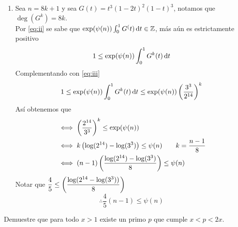 \begin{sol}
\begin{enumerate}[label = \roman*]
		\item Sea $n=8k+1$ y sea $G(t)=t^3(1-2t)^2(1-t)^3$, notamos que $\deg(G^k)=8k$.\\
		      Por \eqref{eq:ii} se sabe que $\exp(\psi(n))\int_0^1G^(t)\operatorname{d}\!{t}\in\mathbb{Z}$, más aún es estrictamente positivo
		      \begin{equation*}
			      1\leq\exp(\psi(n))\int_0^1G^k(t)\operatorname{d}\!{t}
		      \end{equation*}
		      Complementando con \eqref{eq:iii}
		      \begin{equation*}
			      1\leq\exp(\psi(n))\int_0^1G^k(t)\operatorname{d}\!{t}\leq\exp(\psi(n))\left(\frac{3^3}{2^{14}}\right)^k
		      \end{equation*}
		      Así obtenemos que
		      \begin{align*}
			       & \iff\left(\dfrac{2^{14}}{3^3}\right)^k\leq\exp(\psi(n))                    \\
			       & \iff k\left(\log(2^{14})-\log(3^3)\right)\leq\psi(n)\qquad k=\frac{n-1}{8} \\
			       & \iff (n-1)\left(\frac{\log(2^{14})-\log(3^3)}8\right)\leq\psi(n)
		      \end{align*}
		      Notar que $\dfrac45\leq\left(\dfrac{\log(2^{14}-\log(3^3))}8\right)$
		      \begin{equation*}
			      \therefore\frac45(n-1)\leq\psi(n)
		      \end{equation*}
	\end{enumerate}
\end{sol}

\begin{prob}[5 pts.]
	Demuestre que para todo $x>1$ existe un primo $p$ que cumple $x<p<2x$.
\end{prob}

